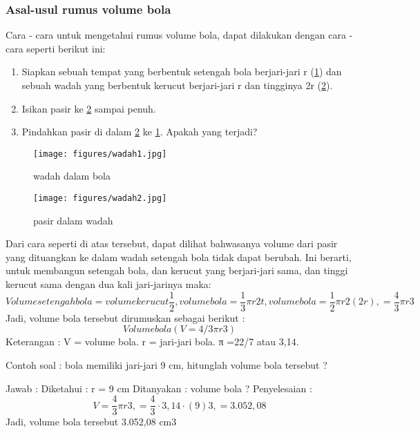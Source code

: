 \subsubsection{Asal-usul rumus volume bola}
Cara - cara untuk mengetahui rumus volume bola, dapat dilakukan dengan cara - cara seperti berikut ini:
\begin{enumerate} 
\item Siapkan sebuah tempat yang berbentuk setengah bola berjari-jari r (\ref{wadah1}) dan sebuah wadah yang berbentuk kerucut berjari-jari r dan tingginya 2r (\ref{wadah2}).
\item Isikan pasir ke \ref{wadah2} sampai penuh.
\item Pindahkan pasir di dalam \ref{wadah2} ke \ref{wadah1}. Apakah yang terjadi?
\end{enumerate}
\begin{figure}[ht]
    \centerline{\texttt{[image: figures/wadah1.jpg]}}
    \caption{wadah dalam bola}
    \label{wadah1}
    \end{figure}
\begin{figure}[ht]
    \centerline{\texttt{[image: figures/wadah2.jpg]}}
    \caption{pasir dalam wadah}
    \label{wadah2}
    \end{figure}

Dari cara seperti di atas tersebut, dapat dilihat bahwasanya volume dari pasir yang dituangkan ke dalam wadah setengah bola tidak dapat berubah. Ini berarti, untuk membangun setengah bola, dan kerucut yang berjari-jari sama, dan tinggi kerucut sama dengan dua kali jari-jarinya maka:
\begin{equation}
Volume setengah bola = volume kerucut \frac{1}{2} ,
volume bola = \frac{1}{3} \pi r2t,
volume bola = \frac{1}{2} \pi r2(2r),
            = \frac{4}{3}\pi r3
\end{equation}
Jadi, volume bola tersebut dirumuskan sebagai berikut :
\begin{equation}
Volume bola ( V = 4/3πr3 )
\end{equation}
Keterangan :
V = volume bola.
r = jari-jari bola.
π =22/7 atau 3,14.

Contoh soal :
bola memiliki jari-jari 9 cm, hitunglah volume bola tersebut ?

Jawab :
Diketahui : r = 9 cm
Ditanyakan : volume bola ?
Penyelesaian :
\begin{equation}
V   = \frac{4}{3}\pi r3,
    = \frac{4}{3} \cdot 3 , 14 \cdot  (9)3,
    = 3.052,08
\end{equation}
Jadi, volume bola tersebut 3.052,08 cm3
